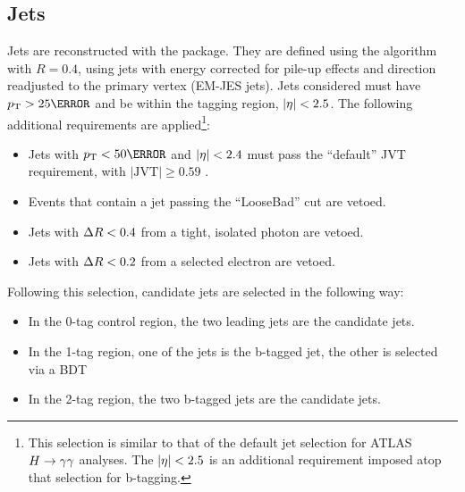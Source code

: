 \subsection{Jets}

Jets are reconstructed with the  \cite{fastjet} package. They are defined using the \antikt algorithm with $R=0.4$, using jets with energy corrected for pile-up effects and direction readjusted to the primary vertex (EM-JES jets). Jets considered must have $\pt > \unit{25}{\GeV}$ and be within the tagging region, $|\eta| < 2.5$. The following additional requirements are applied\footnote{This selection is similar to that of the default jet selection for ATLAS $H\rightarrow \gamma\gamma$ analyses. The $|\eta| < 2.5$ is an additional requirement imposed atop that selection for b-tagging.}:

\begin{itemize}
  \item Jets with $\pt < \unit{50}{\GeV}$ and $|\eta| < 2.4$ must pass the ``default'' \gls{JVT} requirement, with $|\text{JVT}| \geq 0.59$ \cite{JVT}.
  \item Events that contain a jet passing the ``LooseBad'' cut are vetoed. 
  \item Jets with $\Delta R < 0.4$ from a tight, isolated photon are vetoed.
  \item Jets with $\Delta R < 0.2$ from a selected electron are vetoed.
\end{itemize}



Following this selection, candidate jets are selected in the following way:
\begin{itemize}
  \item In the 0-tag control region, the two leading jets are the candidate jets.
  \item In the 1-tag region, one of the jets is the b-tagged jet, the other is selected via a \gls{BDT}
  \item In the 2-tag region, the two b-tagged jets are the candidate jets.
\end{itemize}

